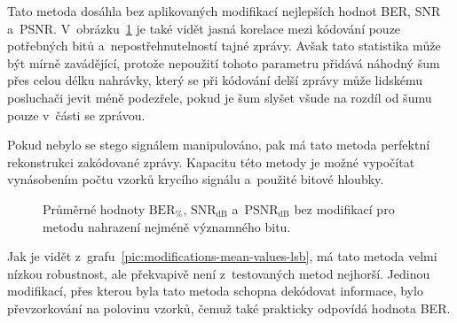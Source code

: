 Tato metoda dosáhla bez aplikovaných modifikací nejlepších hodnot BER, SNR
a~PSNR. V~obrázku~\ref{pic:no-mod-params-mean-values-lsb} je také vidět jasná
korelace mezi kódování pouze potřebných bitů a~nepostřehnutelností tajné
zprávy. Avšak tato statistika může být mírně zavádějící, protože nepoužití
tohoto parametru přidává náhodný šum přes celou délku nahrávky, který se při
kódování delší zprávy může lidskému posluchači jevit méně podezřele, pokud je
šum slyšet všude na rozdíl od šumu pouze v~části se zprávou.

Pokud nebylo se stego signálem manipulováno, pak má tato metoda perfektní
rekonstrukci zakódované zprávy. Kapacitu této metody je možné vypočítat
vynásobením počtu vzorků krycího signálu a~použité bitové hloubky.

\begin{figure}[hbt]
    \table
    \centering
    \caption{Průměrné hodnoty $\mathrm{BER}_{\%}$, $\mathrm{SNR}_\mathrm{dB}$
    a~$\mathrm{PSNR}_\mathrm{dB}$ bez modifikací pro metodu nahrazení nejméně
    významného bitu.}
    \label{pic:no-mod-params-mean-values-lsb}
\end{figure}

Jak je vidět z~grafu~\ref{pic:modifications-mean-values-lsb}, má tato metoda
velmi nízkou robustnost, ale překvapivě není z~testovaných metod nejhorší.
Jedinou modifikací, přes kterou byla tato metoda schopna dekódovat informace,
bylo převzorkování na polovinu vzorků, čemuž také prakticky odpovídá hodnota
BER.

